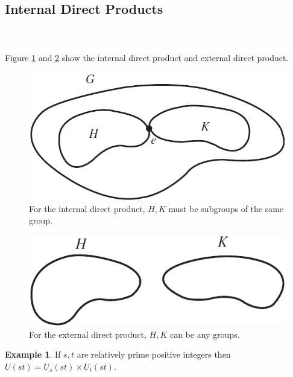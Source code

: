 \documentclass{article}
\theoremstyle{definition}
\newtheorem{definition}{Definition}[section]
\newtheorem{example}{Example}[section]
\begin{document}
        \subsection{Internal Direct Products}
        \\ \\
        Figure \ref{internal_diret_product}
        and \ref{external_direct_product} show the internal direct product and external direct product.
        \begin{figure}[!htbp]
            \centering
            \includegraphics[width=0.6\linewidth]{figures/internal_direct_products.png}
            \caption{For the internal direct product, $H,K$ must be subgroups of the same group.}
            \label{internal_diret_product}
        \end{figure}
        
        \begin{figure}[!htbp]
            \centering
            \includegraphics[width=0.6\linewidth]{figures/external_direct_products.png}
            \caption{For the external direct product, $H,K$ can be any groups.}
            \label{external_direct_product}
        \end{figure}
        
        \begin{example}
        If $s,t$ are relatively prime positive integers then $U(st)=U_s(st) \times U_t(st)$.
        \end{example}
        
\end{document}
